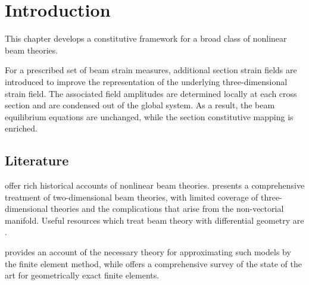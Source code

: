 \section{Introduction}


This chapter develops a constitutive framework for a broad class of nonlinear beam theories. 

For a prescribed set of beam strain measures, additional section strain fields are introduced to improve the representation of the underlying three-dimensional strain field. 
The associated field amplitudes are determined locally at each cross section and are condensed out of the global system. 
As a result, the beam equilibrium equations are unchanged, while the section constitutive mapping is enriched.

\subsection{Literature}

\cite{oreilly2017modeling,goss2003snap} offer rich historical accounts of nonlinear beam theories. 
\cite{hjelmstad2005fundamentals} presents a comprehensive treatment of two-dimensional beam theories, with limited coverage of three-dimensional theories and the complications that arise from the non-vectorial manifold. 
Useful resources which treat beam theory with  differential geometry are \cite{landau1970theory,connor1976analysis}. 

\cite{zienkiewicz2014finite} provides an account of the
necessary theory for approximating such models by the finite element method,
while \cite{meier2019geometrically} offers a comprehensive survey of the 
state of the art for geometrically exact finite elements. 






